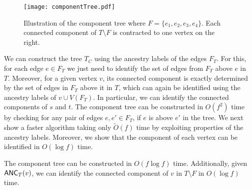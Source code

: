 \setlength{\intextsep}{0pt}
\begin{figure}[h]
\centering
\setlength{\abovecaptionskip}{-2pt}
\setlength{\belowcaptionskip}{6pt}
\texttt{[image: componentTree.pdf]}
 \caption{Illustration of the component tree where $F=\{e_1,e_2,e_3,e_4\}$. Each connected component of $T \setminus F$ is contracted to one vertex on the right.}
\label{componentTreePic}
\end{figure}

We can construct the tree $T_C$ using the ancestry labels of the edges $F_T$.  For this, for each edge $e \in F_T$ we just need to identify the set of edges from $F_T$ above $e$ in $T$. Moreover, for a given vertex $v$, its connected component is exactly determined by the set of edges in $F_T$ above it in $T$, which can again be identified using the ancestry labels of $v \cup V(F_T)$. In particular, we can identify the connected components of $s$ and $t$. The component tree can be constructed in $O(f^2)$ time by checking for any pair of edges $e,e' \in F_T$, if $e$ is above $e'$ in the tree. We next show a faster algorithm taking only $\widetilde{O}(f)$ time by exploiting properties of the ancestry labels. Moreover, we show that the component of each vertex can be identified in $O(\log{f})$ time.

\begin{claim} \label{claim_component_tree}
The component tree can be constructed in $O(f \log{f})$ time. Additionally, given $\mathsf{ANC}_T(v)$, we can identify the connected component of $v$ in $T \setminus F$ in $O(\log{f})$ time.
\end{claim}

